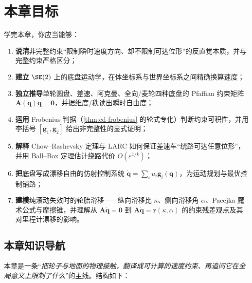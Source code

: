 \section*{本章目标}
学完本章，你应当能够：
\begin{enumerate}
  \item \textbf{说清}非完整约束“限制瞬时速度方向、却不限制可达位形”的反直觉本质，并与完整约束严格区分；
  \item \textbf{建立} $\SE(2)$ 上的底盘运动学，在体坐标系与世界坐标系之间精确换算速度；
  \item \textbf{独立推导}单轮圆盘、差速、阿克曼、全向/麦轮四种底盘的 Pfaffian 约束矩阵 $\mathbf{A}(\mathbf{q})\dot{\mathbf{q}}=\mathbf{0}$，并据维度/秩读出瞬时自由度；
  \item \textbf{运用} Frobenius 判据（\cref{thm:cd-frobenius} 的轮式专化）判断约束可积性，并用李括号 $[\mathbf{g}_1,\mathbf{g}_2]$ 给出非完整性的显式证明；
  \item \textbf{解释} Chow--Rashevsky 定理与 LARC 如何保证差速车“绕路可达任意位形”，并用 Ball--Box 定理估计绕路代价 $O(\varepsilon^{1/k})$；
  \item \textbf{把}底盘写成漂移自由的仿射控制系统 $\dot{\mathbf{q}}=\sum_i u_i\mathbf{g}_i(\mathbf{q})$，为运动规划与最优控制铺路；
  \item \textbf{建模}纯滚动失效时的轮胎滑移——纵向滑移比 $\kappa$、侧向滑移角 $\alpha$、Pacejka 魔术公式与摩擦锥，并理解从 $\mathbf{A}\dot{\mathbf{q}}=\mathbf{0}$ 到 $\mathbf{A}\dot{\mathbf{q}}=\mathbf{r}(\kappa,\alpha)$ 的约束残差观点及其对里程计漂移的影响。
\end{enumerate}

\subsection*{本章知识导航}
本章是一条“\emph{把轮子与地面的物理接触，翻译成可计算的速度约束、再追问它在全局意义上限制了什么}”的主线。结构如下：

